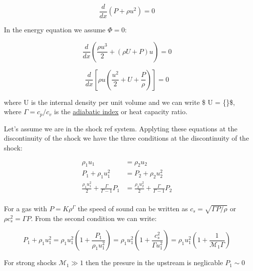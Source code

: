 \documentclass[
  letterpaper,
  DIV=11,
  numbers=noendperiod]{scrreprt}
\begin{document}
\[\frac{d}{dx}(P + \rho u^2) = 0\]

In the energy equation we assume \(\Phi = 0\):

\[\frac{d}{dx}\left(\frac{\rho u^3}{2} + (\rho U + P)u\right) = 0 \]

\[\frac{d}{dx}\left[ \rho u \left(\frac{u^2}{2} + U + \frac{P}{\rho}\right) \right] = 0 \]

where U is the internal density per unit volume and we can write \$
\rho U =  \{\}\$, where \(\Gamma = c_p/c_v\) is the
\href{http://en.wikipedia.org/wiki/Heat_capacity_ratio}{adiabatic index}
or heat capacity ratio.

\begin{tcolorbox}[enhanced jigsaw, colframe=quarto-callout-important-color-frame, leftrule=.75mm, left=2mm, opacitybacktitle=0.6, colbacktitle=quarto-callout-important-color!10!white, coltitle=black, arc=.35mm, titlerule=0mm, toprule=.15mm, opacityback=0, bottomrule=.15mm, breakable, bottomtitle=1mm, rightrule=.15mm, toptitle=1mm, colback=white, title=\textcolor{quarto-callout-important-color}{\faExclamation}\hspace{0.5em}{Conditions of discontinuity at the shochwave}]

Let's assume we are in the shock ref system. Applyting these equations
at the discontinuity of the shock we have the three conditions at the
discontinuity of the shock:

\[\begin{aligned}
\rho_1 u_1 &= \rho_2 u_2\\
P_1 + \rho_1 u_1^2 &= P_2 + \rho_2 u_2^2\\
\frac{\rho_1 u_1^2}{2} + \frac{\Gamma}{\Gamma - 1} P_1 &=\frac{\rho_2 u_2^2}{2} + \frac{\Gamma}{\Gamma - 1}  P_2\\
\end{aligned}\]

\end{tcolorbox}

For a gas with \(P = K \rho^\Gamma\) the speed of sound can be written
as \(c_s = \sqrt{\Gamma P / \rho}\) or \(\rho c_s^2 = \Gamma P\). From
the second condition we can write:

\[ P_1 + \rho_1 u_1^2 =  \rho_1 u_1^2 \left( 1 + \frac{P_1}{\rho_1 u_1^2}\right)  = \rho_1 u_1^2 \left( 1 + \frac{c_s^2}{\Gamma u_1^2}\right) = \rho_1 u_1^2 \left(1 + \frac{1}{\mathcal{M_1}\Gamma}\right) \]

For strong shocks \(\mathcal{M_1} \gg 1\) then the presure in the
upstream is neglicable \(P_1 \sim 0\)
\end{document}
